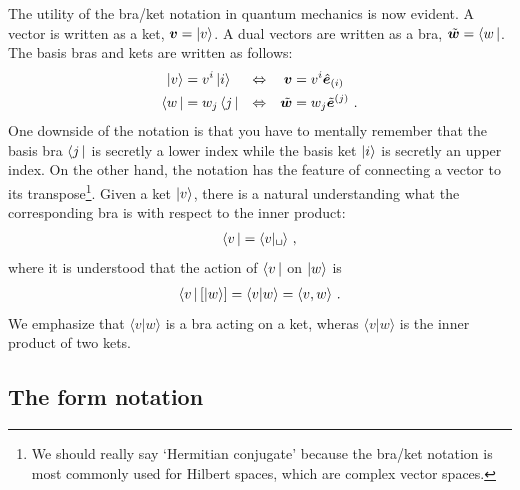 \documentclass[
  11pt,
	colorful,
	raggedright,
]{tufte-style-thesis-flip}
\begin{document}
The utility of the bra/ket notation in quantum mechanics is now evident. A vector is written as a ket, $\boldsymbol{v} = \left|v\right\rangle$. A dual vectors are written as a bra, $\tilde{\boldsymbol{w}} = \left\langle w\,\right|$. The basis bras and kets are written as follows:
\begin{align}
  \left|v\right\rangle &= v^i\left|i\right\rangle &\Leftrightarrow&&
  \boldsymbol{v} &= v^i \hat{\boldsymbol{e}}_{(i)}
  \\
  \left\langle w\,\right| &= w_j\left\langle j\,\right| &\Leftrightarrow&&
  \tilde{\boldsymbol{w}} &= w_j \tilde{\boldsymbol{e}}^{(j)} \ .
\end{align}
One downside of the notation is that you have to mentally remember that the basis bra $\left\langle j\,\right|$ is secretly a lower index while the basis ket $\left|i\right\rangle$ is secretly an upper index. On the other hand, the notation has the feature of connecting a vector to its transpose\footnote{We should really say `Hermitian conjugate' because the bra/ket notation is most commonly used for Hilbert spaces, which are complex vector spaces.}. Given a ket $\left|v\right\rangle$, there is a natural understanding what the corresponding bra is with respect to the inner product:
\begin{align}
  \bra{v} = \langle v | \texttt{\textvisiblespace} \rangle \ ,
\end{align}
where it is understood that the action of $\left\langle v\,\right|$ on $\left|w\right\rangle$ is
\begin{align}
  \left\langle v\,\right|\left[\left|w\right\rangle\right] = \langle v | w\rangle = \langle v, w \rangle \ .
\end{align}
We emphasize that $\langle v | w\rangle$ is a bra acting on a ket, wheras $\langle v | w\rangle$ is the inner product of two kets.


\subsection{The form notation}
\end{document}
